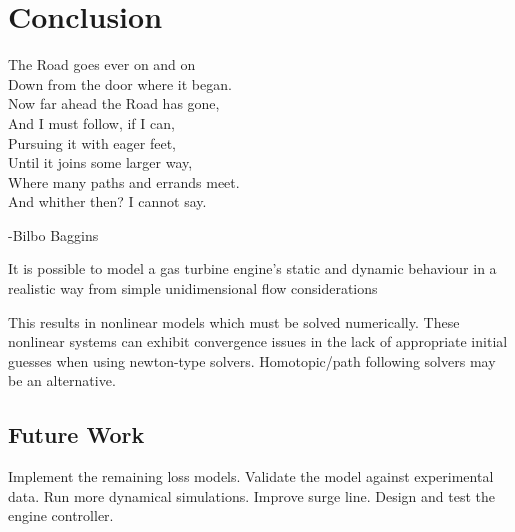 \documentclass[tcc]{subfiles}
\begin{document}
\chapter{Conclusion}
\label{ch:conclusion}
        \epigraph{\centering
        The Road goes ever on and on     \\
        Down from the door where it began.\\
        Now far ahead the Road has gone,\\
        And I must follow, if I can,\\
        Pursuing it with eager feet,\\
        Until it joins some larger way,\\
        Where many paths and errands meet.\\
        And whither then? I cannot say.
        }{-Bilbo Baggins}

        It is possible to model a gas turbine engine's static and dynamic behaviour in a realistic way from simple unidimensional flow considerations

        This results in nonlinear models which must be solved numerically. These nonlinear systems can exhibit convergence issues in the lack of appropriate initial guesses when using newton-type solvers. Homotopic/path following solvers may be an alternative.



        \section{Future Work}
        Implement the remaining loss models. Validate the model against experimental data. Run more dynamical simulations. Improve surge line. Design and test the engine controller.
\end{document}
